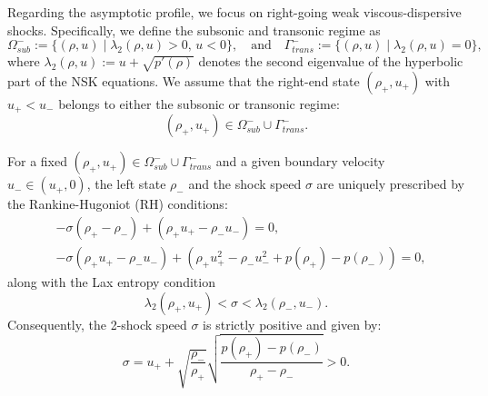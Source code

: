 \documentclass[11pt,reqno]{amsart}
\numberwithin{equation}{section} %
\begin{document}


Regarding the asymptotic profile, we focus on right-going weak viscous-dispersive shocks. Specifically, we define the subsonic and transonic regime as
$$\Omega_{sub}^- := \{(\rho, u) \mid  \lambda_2(\rho,u) > 0, \, u < 0\}, \quad  \text{and} \quad \Gamma_{trans}^- := \{(\rho, u) \mid  \lambda_2(\rho,u) = 0\},$$
where $\lambda_2(\rho,u) := u + \sqrt{p'(\rho)}$ denotes the second eigenvalue of the hyperbolic part of the NSK equations. We assume that the right-end state $(\rho_+, u_+)$ with $u_+ < u_-$ belongs to either the subsonic or transonic regime:
\begin{equation}\label{cond:U+}
(\rho_+, u_+) \in \Omega_{sub}^- \cup  \Gamma_{trans}^-.
\end{equation}

For a fixed $(\rho_+, u_+) \in \Omega_{sub}^- \cup \Gamma_{trans}^-$ and a given boundary velocity $u_- \in (u_+, 0)$, the left state $\rho_-$ and the shock speed $\sigma$ are uniquely prescribed by the Rankine-Hugoniot (RH) conditions:
\begin{equation}
\begin{aligned}\label{RH}
&-\sigma (\rho_+ - \rho_-) + (\rho_+ u_+ - \rho_- u_-) = 0,\\
&-\sigma (\rho_+ u_+ - \rho_- u_-) + (\rho_+ u_+^2 - \rho_- u_-^2 + p(\rho_+) - p(\rho_-)) = 0,
\end{aligned} 
\end{equation}
along with the Lax entropy condition 
\begin{equation} \label{lax}
    \lambda_2(\rho_+,u_+) < \sigma < \lambda_2(\rho_-,u_-).
\end{equation} Consequently, the 2-shock speed $\sigma$ is strictly positive and given by:
\[
\sigma = u_+ + \sqrt{\frac{\rho_-}{\rho_+}}\sqrt{\frac{p(\rho_+) - p(\rho_-)}{\rho_+ - \rho_-}} > 0.
\]
\end{document}
